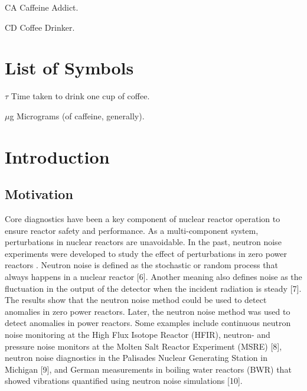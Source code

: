 \documentclass{uiucthesis2021}
\begin{document}
\begin{abbrevlist}
\item[CA] Caffeine Addict.
\item[CD] Coffee Drinker.
\end{abbrevlist}

\chapter{List of Symbols}

\begin{symbollist}[0.7in]
\item[$\tau$] Time taken to drink one cup of coffee.
\item[$\mu$g] Micrograms (of caffeine, generally).
\end{symbollist}

\mainmatter

\chapter{Introduction}

\section{Motivation}

Core diagnostics have been a key component of nuclear reactor operation to ensure reactor safety and performance. As a multi-component system, perturbations in nuclear reactors are unavoidable. In the past, neutron noise experiments were developed to study the effect of perturbations in zero power reactors \cite{akcasuApplicationLangevinTechnique1966,cohnSimplifiedTheoryPile1960,moorePowerNoiseTransfer1959}. Neutron noise is defined as the stochastic or random process that always happens in a nuclear reactor [6]. Another meaning also defines noise as the fluctuation in the output of the detector when the incident radiation is steady [7]. The results show that the neutron noise method could be used to detect anomalies in zero power reactors. Later, the neutron noise method was used to detect anomalies in power reactors. Some examples include continuous neutron noise monitoring at the High Flux Isotope Reactor (HFIR), neutron- and pressure noise monitors at the Molten Salt Reactor Experiment (MSRE) [8], neutron noise diagnostics in the Palisades Nuclear Generating Station in Michigan [9], and German measurements in boiling water reactors (BWR) that showed vibrations quantified using neutron noise simulations [10]. 
\end{document}
